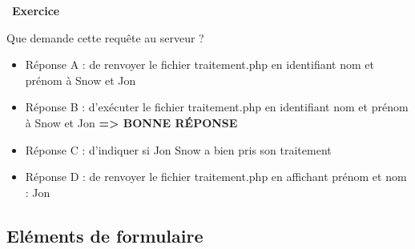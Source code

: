 \documentclass[
  11pt,
]{article}
\providecommand{\tightlist}{%
  \setlength{\itemsep}{0pt}\setlength{\parskip}{0pt}}
\newcounter{exo}
\newenvironment{exercice}[1]
{\par \medskip   \addtocounter{exo}{1} \noindent  
\begin{bclogo}[arrondi =0.1,   noborder = true, logo=\bccrayon, marge=4]{~\textbf{Exercice} \textbf{\theexo} {\itshape #1} }  \par}
{
\end{bclogo}
 \par \bigskip }
\begin{document}
\begin{exercice}{}
\begin{enumerate}
  Que demande cette requête au serveur ?

  \begin{itemize}
  \tightlist
  \item
    Réponse A : de renvoyer le fichier traitement.php en identifiant nom
    et prénom à Snow et Jon
  \item
    Réponse B : d'exécuter le fichier traitement.php en identifiant nom
    et prénom à Snow et Jon \textbf{=\textgreater{} BONNE RÉPONSE}
  \item
    Réponse C : d'indiquer si Jon Snow a bien pris son traitement
  \item
    Réponse D : de renvoyer le fichier traitement.php en affichant
    prénom et nom : Jon
  \end{itemize}
\end{enumerate}

\end{exercice}

\hypertarget{eluxe9ments-de-formulaire}{%
\subsection{Eléments de formulaire}\label{eluxe9ments-de-formulaire}}
\end{document}
